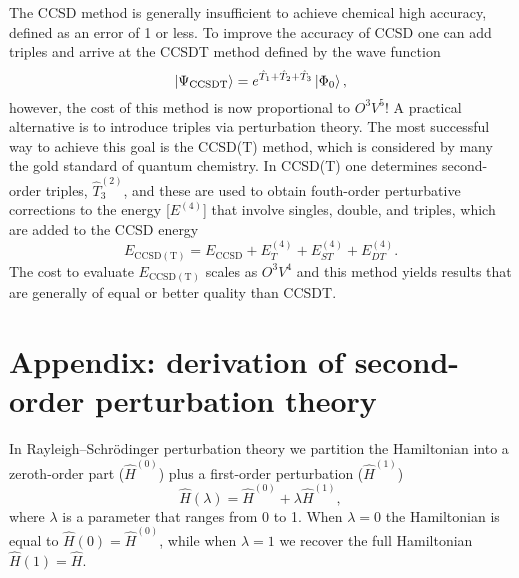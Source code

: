 \documentclass[../Main/chem532-notes.tex]{subfiles}
\begin{document}
The CCSD method is generally insufficient to achieve chemical high accuracy, defined as an error of 1 \kcal or less.
To improve the accuracy of CCSD one can add triples and arrive at the CCSDT method defined by the wave function
\begin{equation}
\ket{\Psi_{\mathrm{CCSDT}}} = e^{\hat{T}_1 + \hat{T}_2+ \hat{T}_3} \ket{\Phi_0},
\end{equation}
however, the cost of this method is now proportional to $O^3V^5$!
A practical alternative is to introduce triples via perturbation theory. The most successful way to achieve this goal is the CCSD(T) method, which is considered by many the gold standard of quantum chemistry.
In CCSD(T) one determines second-order triples, $\hat{T}_3^{(2)}$, and these are used to obtain fouth-order perturbative corrections to the energy [$E^{(4)}$] that involve singles, double, and triples, which are added to the CCSD energy
\begin{equation}
E_{\mathrm{CCSD(T)}} = E_{\mathrm{CCSD}} + E_{T}^{(4)} + E_{ST}^{(4)} + E_{DT}^{(4)}.
\end{equation}
The cost to evaluate $E_{\mathrm{CCSD(T)}}$ scales as $O^3V^4$ and this method yields results that are generally of equal or better quality than CCSDT.

\section*{Appendix: derivation of second-order perturbation theory}

In Rayleigh--Schr\"{o}dinger perturbation theory we partition the Hamiltonian into a zeroth-order part ($\hat{H}^{(0)}$) plus a first-order perturbation ($\hat{H}^{(1)}$)
\begin{equation}
\hat{H}(\lambda) = \hat{H}^{(0)} + \lambda \hat{H}^{(1)},
\end{equation}
where $\lambda$ is a parameter that ranges from 0 to 1. When $\lambda = 0$ the Hamiltonian is equal to $\hat{H}(0) = \hat{H}^{(0)}$, while when $\lambda = 1$ we recover the full Hamiltonian $\hat{H}(1) = \hat{H}$.
\end{document}
